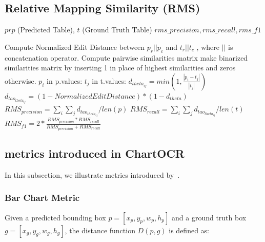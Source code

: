 \documentclass[
	letterpaper, %
]{jdf}
\begin{document}
\subsection{Relative Mapping Similarity (RMS)}\label{app:rms-algorithm}
\begin{algorithm}
    \begin{algorithmic}[1]
 \Require $prp$ (Predicted Table), $t$ (Ground Truth Table)
        \Ensure $rms\_precision, rms\_recall, rms\_f1$

        Compute Normalized Edit Distance between $p_r || p_c$ and $t_r || t_c$
    , where $||$ is concatenation operator.
        Compute pairwise similarities matrix
        make binarized similarities matrix by inserting 1 in place of highest similarities and zeros otherwise.
        \For $p_i$ in p.values:
        \For $t_j$ in t.values:
        $d_{theta_{ij}} = min(1, \frac{|p_i - t_j|}{|t_j|})$
        $d_{tao_{theta_{ij}}} = (1-Normalized Edit Distance) * (1-d_{theta})$
        \EndFor
        \EndFor
        $RMS_{precision} = \sum_{i} \sum_j d_{tao_{theta_{ij}}} / len(p)$
        $RMS_{recall} = \sum_{i} \sum_j d_{tao_{theta_{ij}}} / len(t)$
        $RMS_{f1} = 2 * \frac{RMS_{precision} * RMS_{recall}}{RMS_{precision} + RMS_{recall}}$
    \end{algorithmic}
\end{algorithm}
\subsection{metrics introduced in ChartOCR}\label{ssect:chartocr-metrics}
In this subsection, we illustrate metrics introduced by~\cite{luo2021chartocr}.
\subsubsection{Bar Chart Metric}

Given a predicted bounding box $p = [x_p, y_p, w_p, h_p]$ and a ground truth box $g = [x_g, y_g, w_g, h_g]$, the distance function $D(p, g)$ is defined as:
\end{document}
